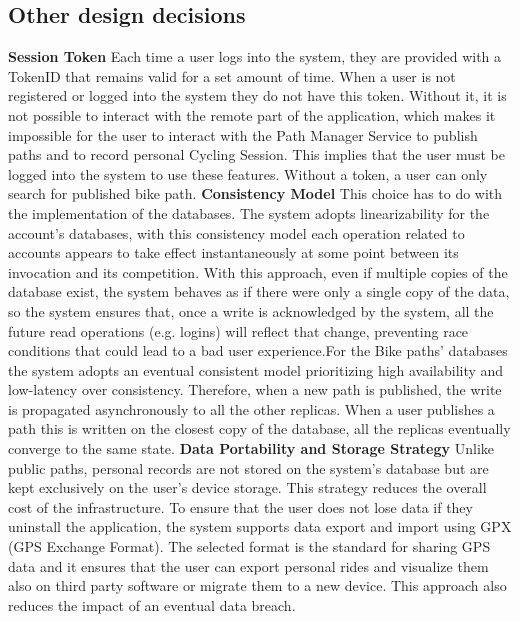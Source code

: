 \subsection{Other design decisions}
\textbf{Session Token}\newline\newline
Each time a user logs into the system, they are provided with a TokenID that 
remains valid for a set amount of time. When a user is not registered or logged into the system they do not have this token.
Without it, it is not possible to interact with the remote part of the application, which makes it impossible for the user to interact with the Path Manager Service to publish paths and to record personal Cycling Session. This implies that the user must be logged into the system to use these features. Without a token, a user
can only search for published bike path.\newline\newline
\textbf{Consistency Model}\newline\newline
This choice has to do with the implementation of the databases. The system adopts linearizability for the account's databases, with this consistency model
each operation related to accounts appears to take effect instantaneously at some point between its invocation and its competition. With this approach,
even if multiple copies of the database exist, the system behaves as if there were only a single copy of the data, so the system ensures that, once a write is acknowledged by the system, all the future read operations (e.g. logins) will reflect that change, preventing race conditions that could lead to a bad user experience.\newline For the Bike paths' databases the system adopts an eventual consistent model prioritizing high
availability and low-latency over consistency. Therefore, when a new path is published, the write is propagated asynchronously to all the other replicas. When a user
publishes a path this is written on the closest copy of the database, all the replicas eventually converge to the same state.\newline\newline
\textbf{Data Portability and Storage Strategy}\newline\newline
Unlike public paths, personal records are not stored on the system's database but are kept exclusively on the user's device storage.
This strategy reduces the overall cost of the infrastructure. To ensure that the user does not lose data if they uninstall the application, the system supports data export and import using
GPX (GPS Exchange Format). The selected format is the standard for sharing GPS data and it ensures that the user can export personal rides and visualize them also on
third party software or migrate them to a new device. This approach also reduces the impact of an eventual data breach.\newline\newline 
